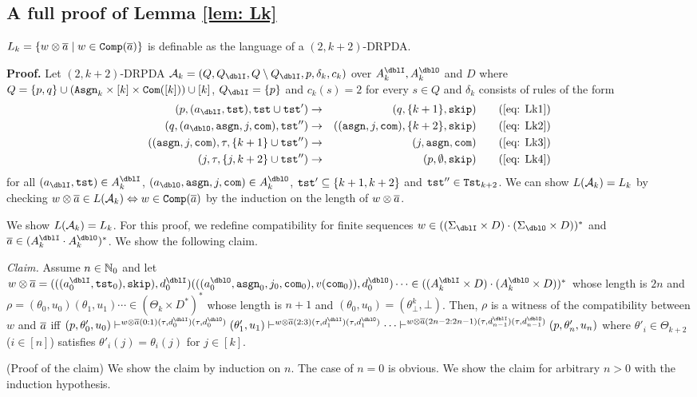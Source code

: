 \subsection{A full proof of Lemma \ref{lem: Lk}}
\setcounter{lemma}{\ref{lem: Lk}}
\addtocounter{lemma}{-1}
\begin{lemma}
$L_k = \{w\otimes{\overline{a}} \mid w\in{\mathtt{Comp}}({\overline{a}})\}$ is definable as the language of a $(2,k+2)$-DRPDA.
\end{lemma}
{\bf Proof.}\quad
Let $(2,k+2)$-DRPDA
$\calA_k = (Q, Q_\dblI, Q\setminus Q_\dblI, p, \delta_k, c_k)$ over $A_k^\dblI, A_k^\dblO$ and $D$ where
$Q=\{p, q\}\cup(\mathtt{Asgn}_k\times[k]\times\mathtt{Com}([k]))\cup[k]$, $Q_\dblI=\{p\}$
and $c_k(s)=2$ for every $s\in Q$ and $\delta_k$ consists of rules of the form
\begin{align}
(p, (a_\dblI, \tst), \tst\cup\tst') &\to& (q, \{k+1\}, \skip) \tag{\ref{eq: Lk1}}\\
(q, (a_\dblO, \asgn, j, \com), \tst'')&\to& ((\asgn,j,\com), \{k+2\},\skip)\tag{\ref{eq: Lk2}}\\
((\asgn,j,\com), \tau, \{k+1\}\cup\tst'')&\to& (j, \asgn, \com)\tag{\ref{eq: Lk3}}\\
(j, \tau, \{j, k+2\}\cup\tst'')&\to& (p, \emptyset, \skip)\tag{\ref{eq: Lk4}}
\end{align}
for all $(a_\dblI, \tst)\in A_k^\dblI$, $(a_\dblO, \asgn, j, \com)\in A_k^\dblO$, $\mathtt{tst}'\subseteq \{k+1,k+2\}$ and $\mathtt{tst}''\in\mathtt{Tst}_{k+2}$.
We can show $L({\cal A}_k)=L_k$
by checking $w\otimes{\overline{a}} \in L({\cal A}_k)\Leftrightarrow
w\in{\mathtt{Comp}}({\overline{a}})$ by the induction on the length of $w\otimes{\overline{a}}$.

We show $L({\cal A}_k) = L_k$.
For this proof, we redefine compatibility for finite sequences $w\in ((\Sigma_\dblI\times D)\cdot (\Sigma_\dblO\times D))^*$ and $\overa\in(A_k^\dblI\cdot A_k^\dblO)^*$.
We show the following claim.
\par\medskip\noindent
{\it Claim.} Assume $n\in\mathbb{N}_0$ and let $w\otimes\overa = (((a^\dblI_0,\tst_0),\skip), d^\dblI_0)(((a^\dblO_0,\asgn_0,j_0, \com_0), v(\com_0)), d^\dblO_0)\cdots\in ((A_k^\dblI\times D)\cdot(A_k^\dblO\times D))^*$
whose length is $2n$ and
$\rho = (\theta_0,u_0)(\theta_1, u_1)\cdots\in (\Theta_k\times D^*)^*$ whose length is $n+1$ and $(\theta_0, u_0)=(\theta^{k}_\bot, \bot)$.
Then,
$\rho$ is a witness of the compatibility between $w$ and ${\overline{a}}$ iff
$(p,\theta'_0,u_0)\vdash^{w\otimes\overa(0:1)(\tau,d^\dblI_{0})(\tau,d^\dblO_{0})}(\theta'_1,u_1)\vdash^{w\otimes\overa(2:3)(\tau,d^\dblI_{1})(\tau,d^\dblO_{1})}\cdots\vdash^{w\otimes\overa(2n-2:2n-1)(\tau,d^\dblI_{n-1})(\tau,d^\dblO_{n-1})}(p,\theta'_{n},u_{n})$
where $\theta'_i\in \Theta_{k+2}$ ($i\in[n]$) satisfies $\theta'_i(j)=\theta_i(j)$ for $j\in[k]$.
\par\medskip\noindent
(Proof of the claim)
We show the claim by induction on $n$.
The case of $n=0$ is obvious.
We show the claim for arbitrary $n>0$ with the induction hypothesis.

